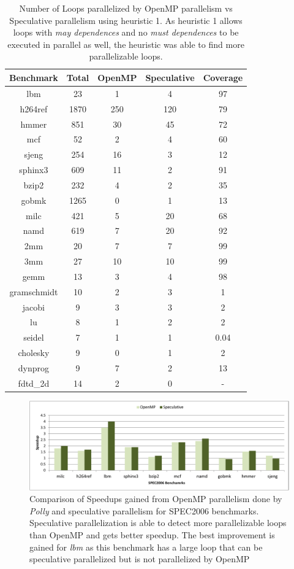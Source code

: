 \documentclass[10pt]{report}          %
\begin{document}
\begin{table}
\centering
\caption{Number of Loops parallelized by OpenMP parallelism vs Speculative parallelism using heuristic 1.  As heuristic 1 allows loops with \textit{may dependences} and no \textit{must dependences} to be executed in parallel as well, the heuristic was able to find more parallelizable loops.}
\begin{tabular}{|c||c|c|c|c|} \hline
Benchmark &Total & OpenMP & Speculative & Coverage\\ \hline 
lbm & 23 & 1	 & 4 & 97 \\ \hline
h264ref & 1870 & 250	 & 120 & 79  \\ \hline
hmmer &	851	 & 30 & 45 & 72 \\ \hline
mcf & 52 & 2 & 4 & 60 \\ \hline
sjeng &	254 & 16	 & 3 & 12 \\ \hline
sphinx3 & 609 & 11 & 2 & 91 \\ \hline
bzip2 & 232 & 4 & 2 & 35 \\ \hline
gobmk & 1265 & 0 & 1 & 13 \\ \hline
milc & 421 & 5 & 20 & 68 \\ \hline
namd & 619 & 7& 20 &92 \\ \hline
2mm	&20& 7 &7 & 99 \\ \hline
3mm	&27& 10&10 & 99 \\ \hline
gemm	 &13& 3&4 & 98 \\ \hline
gramschmidt	&10& 2&3 & 1 \\ \hline
jacobi & 9&	3& 3 & 2 \\ \hline
lu	& 8 & 1 & 2 & 2 \\ \hline
seidel&	7& 1 & 1 & 0.04 \\ \hline
cholesky & 9 & 0 & 1 & 2  \\ \hline
dynprog & 9 & 7 & 2 & 13 \\ \hline
fdtd\_2d & 14 & 2 & 0 & - \\ \hline
\hline\end{tabular}
\label{table:coverage_1}
\end{table}

\begin{figure}
\centering
\includegraphics[scale=0.75]{./pdf/openmp_vs_spec}
\caption{Comparison of Speedups gained from OpenMP parallelism done by \textit{Polly} and speculative parallelism for SPEC2006 benchmarks. Speculative parallelization is able to detect more parallelizable loops than OpenMP and gets better speedup. The best improvement is gained for \textit{lbm} as this benchmark has a large loop that can be speculative parallelized but is not parallelized by OpenMP}
\label{fig:openmp_vs_spec}
\end{figure}
\end{document}
